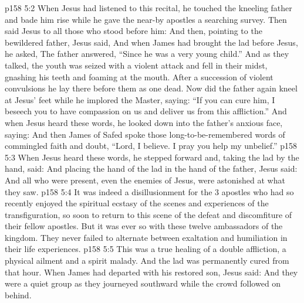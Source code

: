 \vs p158 5:2 When Jesus had listened to this recital, he touched the kneeling father and bade him rise while he gave the near\hyp{}by apostles a searching survey. Then said Jesus to all those who stood before him:  And then, pointing to the bewildered father, Jesus said,  And when James had brought the lad before Jesus, he asked,  The father answered, “Since he was a very young child.” And as they talked, the youth was seized with a violent attack and fell in their midst, gnashing his teeth and foaming at the mouth. After a succession of violent convulsions he lay there before them as one dead. Now did the father again kneel at Jesus’ feet while he implored the Master, saying: “If you can cure him, I beseech you to have compassion on us and deliver us from this affliction.” And when Jesus heard these words, he looked down into the father’s anxious face, saying:  And then James of Safed spoke those long\hyp{}to\hyp{}be\hyp{}remembered words of commingled faith and doubt, “Lord, I believe. I pray you help my unbelief.”
\vs p158 5:3 When Jesus heard these words, he stepped forward and, taking the lad by the hand, said:  And placing the hand of the lad in the hand of the father, Jesus said:  And all who were present, even the enemies of Jesus, were astonished at what they saw.
\vs p158 5:4 It was indeed a disillusionment for the 3 apostles who had so recently enjoyed the spiritual ecstasy of the scenes and experiences of the transfiguration, so soon to return to this scene of the defeat and discomfiture of their fellow apostles. But it was ever so with these twelve ambassadors of the kingdom. They never failed to alternate between exaltation and humiliation in their life experiences.
\vs p158 5:5 This was a true healing of a double affliction, a physical ailment and a spirit malady. And the lad was permanently cured from that hour. When James had departed with his restored son, Jesus said:  And they were a quiet group as they journeyed southward while the crowd followed on behind.

